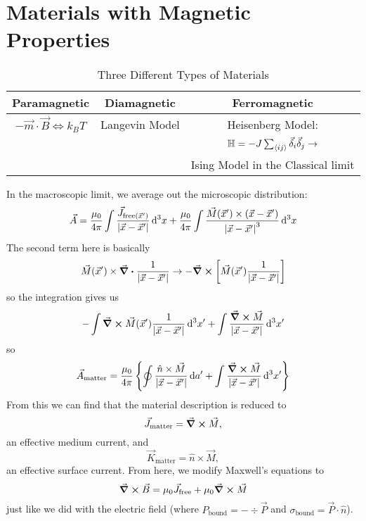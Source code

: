 \documentclass[a4paper,twoside,master.tex]{subfiles}
\begin{document}
\section{Materials with Magnetic Properties}
\label{sec:materials_with_magnetic_properties}

\begin{table}
    \centering
    \begin{tabular}{c c c}
        Paramagnetic & Diamagnetic & Ferromagnetic\\
        \hline\hline
        $ - \vec{m} \cdot \vec{B} \iff k_B T $ & Langevin Model & Heisenberg Model:\\
        &&$ \mathbb{H} = -J \sum_{\expval{ij}} \vec{\delta}_i \vec{\delta}_j \rightarrow $\\
        &&Ising Model in the Classical limit
    \end{tabular}
    \caption{Three Different Types of Materials}
    \label{tab:three_different_types_of_materials}
\end{table}

In the macroscopic limit, we average out the microscopic distribution:
\begin{equation}
    \vec{A} = \frac{\mu_0}{4 \pi} \int \frac{ \vec{J}_{\text{free}( \vec{x}')}}{\abs{ \vec{x} - \vec{x}'}} \dd[3]{x} + \frac{\mu_0}{4 \pi} \int \frac{ \vec{M}( \vec{x}') \times ( \vec{x} - \vec{x}')}{\abs{ \vec{x} - \vec{x}'}^3} \dd[3]{x}
\end{equation}
The second term here is basically
\begin{equation}
    \vec{M}( \vec{x}') \times \div{\frac{1}{\abs{ \vec{x} - \vec{x}'}}} \to -\curl{\left[ \vec{M}( \vec{x}') \frac{1}{\abs{ \vec{x} - \vec{x}'}} \right]}
\end{equation}
so the integration gives us
\begin{equation}
    - \int \curl{ \vec{M}( \vec{x}') \frac{1}{\abs{ \vec{x} - \vec{x}'}}} \dd[3]{x'} + \int \frac{\curl{ \vec{M}}}{\abs{ \vec{x} - \vec{x}'}} \dd[3]{x'}
\end{equation}
so
\begin{equation}
    \vec{A}_{\text{matter}} = \frac{\mu_0}{4 \pi} \left\{ \oint \frac{ \hat{n} \times \vec{M}}{\abs{ \vec{x} - \vec{x}'}} \dd{a'} + \int \frac{\curl{ \vec{M}}}{\abs{ \vec{x} - \vec{x}'}}  \dd[3]{x'} \right\}
\end{equation}
From this we can find that the material description is reduced to
\begin{equation}
    \vec{J}_{\text{matter}} = \curl{ \vec{M}},
\end{equation}
an effective medium current, and
\begin{equation}
    \vec{K}_{\text{matter}} = \hat{n} \times \vec{M},
\end{equation}
an effective surface current. From here, we modify Maxwell's equations to
\begin{equation}
    \curl{ \vec{B}} = \mu_0 \vec{J}_{\text{free}} + \mu_0 \curl{ \vec{M}}
\end{equation}
just like we did with the electric field (where $ P_{\text{bound}} = - \div{ \vec{P}} $ and $ \sigma_{\text{bound}} = \vec{P} \cdot \hat{n} $).
    
\end{document}
